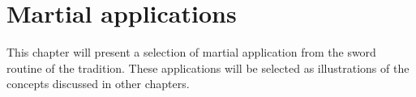 \chapter{Martial applications}\label{ch:applications}

This chapter will present a selection of martial application from the \Kunlun{} sword routine of the \Yangjia{} \Michuan{} \Taijijian{} tradition. These applications will be selected as illustrations of the concepts discussed in other chapters.